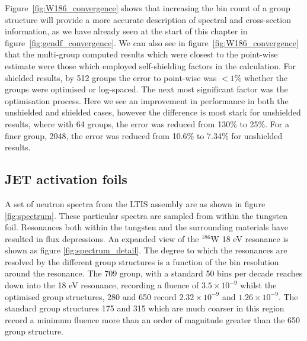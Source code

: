Figure~\ref{fig:W186_convergence} shows that increasing the bin count of a group structure will provide a more accurate description of spectral and cross-section information, as we have already seen at the start of this chapter in figure~\ref{fig:gendf_convergence}. We can also see in figure~\ref{fig:W186_convergence} that the multi-group computed results which were closest to the point-wise estimate were those which employed self-shielding factors in the calculation. For shielded results, by 512 groups the error to point-wise was $< 1\%$ whether the groups were optimised or log-spaced. The next most significant factor was the optimisation process. Here we see an improvement in performance in both the unshielded and shielded cases, however the difference is most stark for unshielded results, where with 64 groups, the error was reduced from 130\% to 25\%. For a finer group, 2048, the error was reduced from 10.6\% to 7.34\% for unshielded results.

\subsection{JET activation foils}
A set of neutron spectra from the LTIS assembly are as shown in figure \ref{fig:spectrum}. These particular spectra are sampled from within the tungsten foil. Resonances both within the tungsten and the surrounding materials have resulted in flux depressions. An expanded view of the $^{186}$W 18 eV resonance is shown as figure \ref{fig:spectrum_detail}. The degree to which the resonances are resolved by the different group structures is a function of the bin resolution around the resonance. The 709 group, with a standard 50 bins per decade reaches down into the 18 eV resonance, recording a fluence of $3.5\times10^{-9}$ whilst the optimised group structures, 280 and 650 record $2.32\times10^{-9}$ and $1.26\times10^{-9}$. The standard group structures 175 and 315 which are much coarser in this region record a minimum fluence more than an order of magnitude greater than the 650 group structure.

